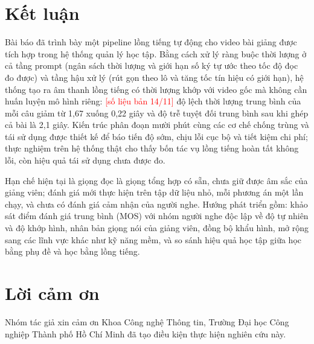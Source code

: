 \documentclass{IEEEtran}
\newcommand{\todo}[1]{\textcolor{red}{[#1]}}
\begin{document}
\section{Kết luận}
\label{sec:conclusion}
Bài báo đã trình bày một pipeline lồng tiếng tự động cho video bài giảng được tích hợp trong hệ thống quản lý học tập. Bằng cách xử lý ràng buộc thời lượng ở cả tầng prompt (ngân sách thời lượng và giới hạn số ký tự ước theo tốc độ đọc đo được) và tầng hậu xử lý (rút gọn theo lô và tăng tốc tín hiệu có giới hạn), hệ thống tạo ra âm thanh lồng tiếng có thời lượng khớp với video gốc mà không cần huấn luyện mô hình riêng: \todo{số liệu bản 14/11} độ lệch thời lượng trung bình của mỗi câu giảm từ 1,67 xuống 0,22 giây và độ trễ tuyệt đối trung bình sau khi ghép cả bài là 2,1 giây. Kiến trúc phân đoạn mười phút cùng các cơ chế chống trùng và tái sử dụng được thiết kế để báo tiến độ sớm, chịu lỗi cục bộ và tiết kiệm chi phí; thực nghiệm trên hệ thống thật cho thấy bốn tác vụ lồng tiếng hoàn tất không lỗi, còn hiệu quả tái sử dụng chưa được đo.

Hạn chế hiện tại là giọng đọc là giọng tổng hợp có sẵn, chưa giữ được âm sắc của giảng viên; đánh giá mới thực hiện trên tập dữ liệu nhỏ, mỗi phương án một lần chạy, và chưa có đánh giá cảm nhận của người nghe. Hướng phát triển gồm: khảo sát điểm đánh giá trung bình (MOS) với nhóm người nghe độc lập về độ tự nhiên và độ khớp hình, nhân bản giọng nói của giảng viên, đồng bộ khẩu hình, mở rộng sang các lĩnh vực khác như kỹ năng mềm, và so sánh hiệu quả học tập giữa học bằng phụ đề và học bằng lồng tiếng.

\section*{Lời cảm ơn}
Nhóm tác giả xin cảm ơn Khoa Công nghệ Thông tin, Trường Đại học Công nghiệp Thành phố Hồ Chí Minh đã tạo điều kiện thực hiện nghiên cứu này.
\end{document}

